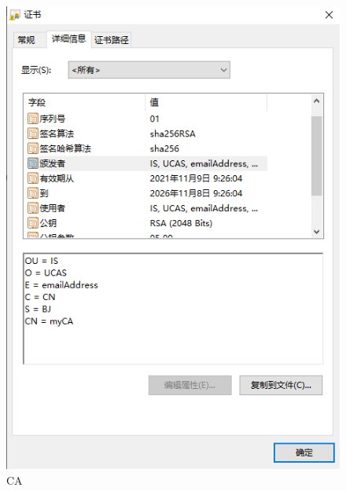 \begin{figure}
\begin{center}
\includegraphics{figs/certificate2.PNG}
\end{center}
\caption{CA}
\label{ca}
\end{figure}